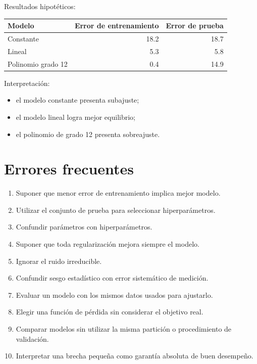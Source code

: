 \documentclass[
  spanish,
  11pt,
  letterpaper,
  DIV=11,
  numbers=noendperiod]{scrreprt}
\newcounter{none} %
\providecommand{\tightlist}{%
  \setlength{\itemsep}{0pt}\setlength{\parskip}{0pt}}
\theoremstyle{definition}
\theoremstyle{plain}
\theoremstyle{definition}
\theoremstyle{remark}
\begin{document}
Resultados hipotéticos:

{\def\LTcaptype{none} %
\begin{longtable}[]{@{}lrr@{}}
\toprule\noalign{}
Modelo & Error de entrenamiento & Error de prueba \\
\midrule\noalign{}
\endhead
\bottomrule\noalign{}
\endlastfoot
Constante & 18.2 & 18.7 \\
Lineal & 5.3 & 5.8 \\
Polinomio grado 12 & 0.4 & 14.9 \\
\end{longtable}
}

Interpretación:

\begin{itemize}
\tightlist
\item
  el modelo constante presenta subajuste;
\item
  el modelo lineal logra mejor equilibrio;
\item
  el polinomio de grado 12 presenta sobreajuste.
\end{itemize}

\section{Errores frecuentes}\label{errores-frecuentes-4}

\begin{enumerate}
\def\labelenumi{\arabic{enumi}.}
\tightlist
\item
  Suponer que menor error de entrenamiento implica mejor modelo.
\item
  Utilizar el conjunto de prueba para seleccionar hiperparámetros.
\item
  Confundir parámetros con hiperparámetros.
\item
  Suponer que toda regularización mejora siempre el modelo.
\item
  Ignorar el ruido irreducible.
\item
  Confundir sesgo estadístico con error sistemático de medición.
\item
  Evaluar un modelo con los mismos datos usados para ajustarlo.
\item
  Elegir una función de pérdida sin considerar el objetivo real.
\item
  Comparar modelos sin utilizar la misma partición o procedimiento de
  validación.
\item
  Interpretar una brecha pequeña como garantía absoluta de buen
  desempeño.
\end{enumerate}
\end{document}
